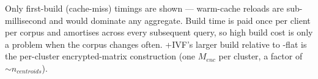 Only first-build (cache-miss) timings are shown --- warm-cache
reloads are sub-millisecond and would dominate any aggregate.
Build time is paid once per client per corpus and amortises
across every subsequent query, so high build cost is only a
problem when the corpus changes often. \bntm+IVF's larger build
relative to \bntm-flat is the per-cluster encrypted-matrix
construction (one $M_{enc}$ per cluster, a factor of $\sim
n_{centroids}$).
